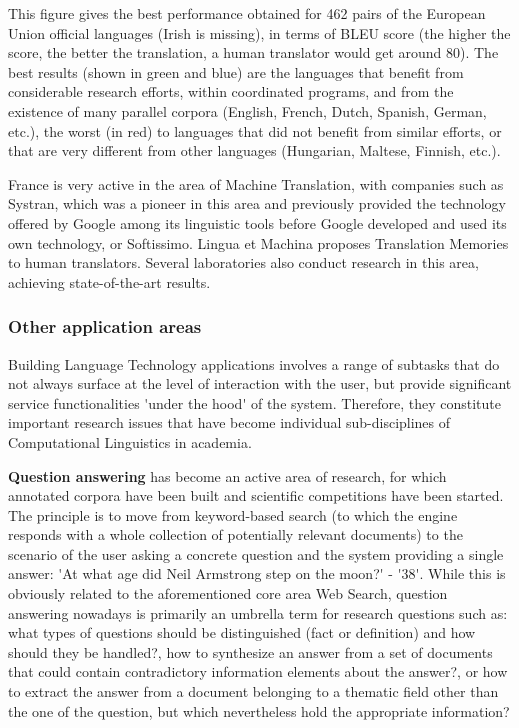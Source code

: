 \documentclass[]{../metanetpaper}
\begin{document}
\begin{multicols}{2}
This figure gives the best performance obtained for 462 pairs of the
European Union official languages (Irish is missing), in terms of BLEU
score (the higher the score, the better the translation, a human
translator would get around 80). The best results (shown in green and
blue) are the languages that benefit from considerable research
efforts, within coordinated programs, and from the existence of many
parallel corpora (English, French, Dutch, Spanish, German, etc.), the
worst (in red) to languages that did not benefit from similar efforts,
or that are very different from other languages (Hungarian, Maltese,
Finnish, etc.).

France is very active in the area of Machine Translation, with
companies such as Systran, which was a pioneer in this area and
previously provided the technology offered by Google among its
linguistic tools before Google developed and used its own technology,
or Softissimo. Lingua et Machina proposes Translation Memories to
human translators. Several laboratories also conduct research in this
area, achieving state-of-the-art results.

\subsubsection{Other application areas}

Building Language Technology applications involves a range of subtasks
that do not always surface at the level of interaction with the user,
but provide significant service functionalities {\mbox '}under the hood{\mbox '} of
the system. Therefore, they constitute important research issues that
have become individual sub-disciplines of Computational Linguistics in
academia.

{\bf Question answering} has become an active area of research, for
which annotated corpora have been built and scientific competitions
have been started. The principle is to move from keyword-based search
(to which the engine responds with a whole collection of potentially
relevant documents) to the scenario of the user asking a concrete
question and the system providing a single answer: {\mbox '}At what
age did Neil Armstrong step on the moon?{\mbox '} - {\mbox '}38{\mbox
  '}. While this is obviously related to the aforementioned core area
Web Search, question answering nowadays is primarily an umbrella term
for research questions such as: what types of questions should be
distinguished (fact or definition) and how should they be handled?, how
to synthesize an answer from a set of documents that could contain
contradictory information elements about the answer?, or how to extract
the answer from a document belonging to a thematic field other than
the one of the question, but which nevertheless hold the appropriate
information?


\end{multicols}
\end{document}
